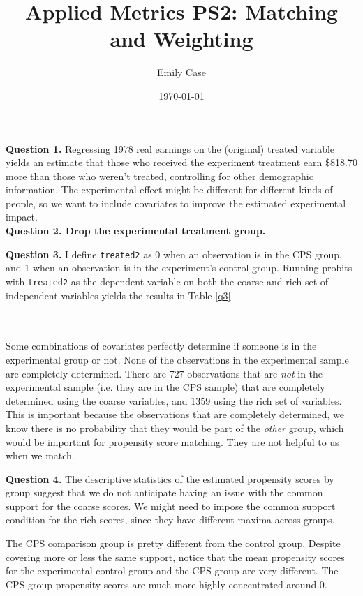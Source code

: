 \documentclass[12pt]{article}
\author{Emily Case}
\date{\today}
\title{Applied Metrics PS2: Matching and Weighting}
\begin{document}
\maketitle

\textbf{Question 1.} Regressing 1978 real earnings on the (original) treated variable yields an estimate that those who received the experiment treatment earn \$818.70 more than those who weren't treated, controlling for other demographic information. The experimental effect might be different for different kinds of people, so we want to include covariates to improve the estimated experimental impact. \\


\bigskip 
\textbf{Question 2. Drop the experimental treatment group.}

\bigskip
\textbf{Question 3.}
I define \texttt{treated2} as 0 when an observation is in the CPS group, and 1 when an observation is in the experiment's control group. Running probits with \texttt{treated2} as the dependent variable on both the coarse and rich set of independent variables yields the results in Table \ref{q3}. 

\\\\
Some combinations of covariates perfectly determine if someone is in the experimental group or not. None of the observations in the experimental sample are completely determined. There are 727 observations that are \textit{not} in the experimental sample (i.e. they are in the CPS sample) that are completely determined using the coarse variables, and 1359 using the rich set of variables. This is important because the observations that are completely determined, we know there is no probability that they would be part of the \textit{other} group, which would be important for propensity score matching. They are not helpful to us when we match. 


\newpage
\textbf{Question 4.} 
The descriptive statistics of the estimated propensity scores by group suggest that we do not anticipate having an issue with the common support for the coarse scores. We might need to impose the common support condition for the rich scores, since they have different maxima across groups. 


The CPS comparison group is pretty different from the control group. Despite covering more or less the same support, notice that the mean propensity scores for the experimental control group and the CPS group are very different. The CPS group propensity scores are much more highly concentrated around 0. 
\end{document}
